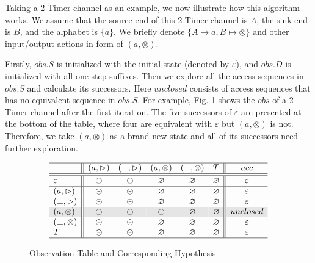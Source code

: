 \documentclass[conference, a4paper]{IEEEtran}
\newcommand{\rblock}[0]{\circleddash}
\newcommand{\rread}[0]{\rhd}
\newcommand{\rnoread}[0]{\otimes}
\newcommand{\rempty}[0]{\varnothing}
\begin{document}
Taking a 2-Timer channel as an example, we now illustrate how this algorithm works. 
We assume that the source end of this 2-Timer channel is $A$, the sink end is $B$, and the alphabet
is $\{a\}$. We briefly denote $\{A\mapsto a,B\mapsto \rnoread\}$ and other input/output actions in form of
$(a,\rnoread)$.

Firstly, $obs.S$ is initialized with the initial state (denoted by $\varepsilon$), and $obs.D$ is
initialized with all one-step suffixes.
Then we explore all the access sequences in $obs.S$ and calculate its successors. Here
$unclosed$ consists of access sequences that has no equivalent sequence in $obs.S$. 
For example, Fig. \ref{fig:hypo} shows the $obs$ of a 2-Timer channel after the first
iteration. The five successors of $\varepsilon$ are presented at the bottom of the table, where
four are equivalent with $\varepsilon$ but $(a,\rnoread)$ is not. Therefore, we take $(a,\rnoread)$ as a
brand-new state and all of its successors need further exploration. 

\begin{figure}[ht]
  \begin{center}
    \begin{displaymath}
      \begin{array}{l||ccccc||c}
        \hline
        & (a,\rread) & (\bot,\rread) & (a,\rnoread) & (\bot,\rnoread) & T & acc\\
        \hline\hline
        \varepsilon & \rblock & \rblock & \rempty & \rempty & \rempty & \varepsilon\\
        \hline
        (a,\rread) & \rblock & \rblock & \rempty & \rempty & \rempty & \varepsilon\\
        (\bot,\rread) & \rblock & \rblock & \rempty & \rempty & \rempty & \varepsilon \\
        \rowcolor[gray]{.9}
        (a,\rnoread) & \rblock & \rblock & \rblock & \rempty & \rempty & unclosed\\
        (\bot,\rnoread) & \rblock & \rblock & \rempty & \rempty & \rempty & \varepsilon \\
        T & \rblock & \rblock & \rempty & \rempty & \rempty & \varepsilon \\
        \hline
      \end{array}
    \end{displaymath}
  \end{center}
  \caption{Observation Table and Corresponding Hypothesis}
  \label{fig:hypo}
\end{figure}
\end{document}
